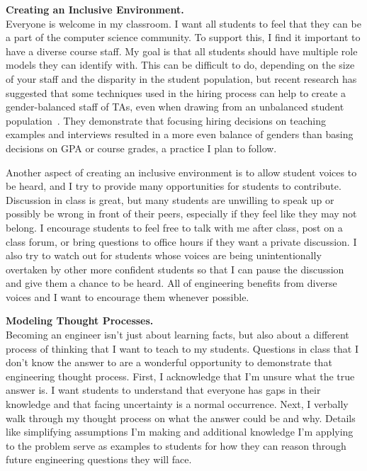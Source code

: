 \documentclass[11pt]{article} %
\begin{document}
\bigskip
\textbf{\textsf{\large Creating an Inclusive Environment.}}\\
Everyone is welcome in my classroom. I want all students to feel that they can
be a part of the computer science community.
%
To support this, I find it important to have a diverse course staff. My goal is
that all students should have multiple role models they can identify with.
%
This can be difficult to do, depending on the size of your staff and the
disparity in the student population, but recent research has suggested that
some techniques used in the hiring process can help to create a gender-balanced
staff of TAs, even when drawing from an unbalanced student
population~\footnotemark{}. They demonstrate that focusing hiring decisions on
teaching examples and interviews resulted in a more even balance of genders
than basing decisions on GPA or course grades, a practice I plan to follow.


Another aspect of creating an inclusive environment is to allow student voices
to be heard, and I try to provide many opportunities for students to
contribute.
%
Discussion in class is great, but many students are unwilling to speak up or
possibly be wrong in front of their peers, especially if they feel like they
may not belong.
%
I encourage students to feel free to talk with me after class, post on a class
forum, or bring questions to office hours if they want a private discussion. I
also try to watch out for students whose voices are being unintentionally
overtaken by other more confident students so that I can pause the discussion
and give them a chance to be heard.
%
All of engineering benefits from diverse voices and I want to encourage them
whenever possible.


\bigskip
\textbf{\textsf{\large Modeling Thought Processes.}}\\
Becoming an engineer isn't just about learning facts, but also about a
different process of thinking that I want to teach to my students. Questions in
class that I don't know the answer to are a wonderful opportunity to
demonstrate that engineering thought process. First, I acknowledge that I'm
unsure what the true answer is. I want students to understand that everyone has
gaps in their knowledge and that facing uncertainty is a normal occurrence.
Next, I verbally walk through my thought process on what the answer could be
and why. Details like simplifying assumptions I'm making and additional
knowledge I'm applying to the problem serve as examples to students for how
they can reason through future engineering questions they will face.
\end{document}
